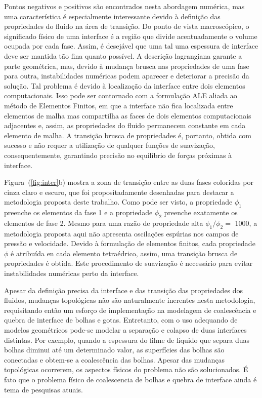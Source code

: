\documentclass[a4paper,portuges,12pt]{article}
\begin{document}
Pontos negativos e positivos são encontrados nesta abordagem numérica,
mas uma característica é especialmente interessante devido à definição
das propriedades do fluido na área de transição. Do ponto de vista
macroscópico, o significado físico de uma interface é a região que
divide acentuadamente o volume ocupada por cada fase. Assim, é desejável
que uma tal uma espessura de interface deve ser mantida tão fina quanto
possível. A descrição lagrangiana garante a parte geométrica, mas,
devido à mudança brusca nas propriedades de uma fase para outra,
instabilidades numéricas podem aparecer e deteriorar a precisão da
solução. Tal problema é devido à localização da interface entre dois
elementos computacionais. Isso pode ser contornado com a formulação ALE
aliada ao método de Elementos Finitos, em que a interface não fica
localizada entre elementos de malha mas compartilha as faces de dois
elementos computacionais adjacentes e, assim, as propriedades do fluido
permanecem constante em cada elemento de malha. A transição brusca de
propriedades é, portanto, obtida com sucesso e não requer a utilização
de qualquer funções de suavização, consequentemente, garantindo precisão
no equilíbrio de forças próximas à interface.

Figura~(\ref{fig:inter}b) mostra a zona de transição entre as duas fases
coloridas por cinza claro e escuro, que foi propositadamente desenhadas
para destacar a metodologia proposta deste trabalho. Como pode ser
visto, a propriedade $\phi_1$ preenche os elementos da fase 1 e a
propriedade $\phi_2$ preenche exatamente os elementos de fase 2. Mesmo
para uma razão de propriedade alta $\phi_1 / \phi_2 =$ 1000, a
metodologia proposta aqui não apresenta oscilações espúrias nos campos
de pressão e velocidade. Devido à formulação de elementos finitos, cada
propriedade $\phi$ é atribuída en cada elemento tetraédrico, assim, uma
transição brusca de propriedades é obtida. Este procedimento de
suavização é necessário para evitar instabilidades numéricas perto da
interface.

Apesar da definição precisa da interface e das transição das
propriedades dos fluidos, mudanças topológicas não são naturalmente
inerentes nesta metodologia, requisitando então um esforço de
implementação na modelagem de coalescência e quebra de interface de
bolhas e gotas. Entretanto, com o uso adequando de modelos geométricos
pode-se modelar a separação e colapso de duas interfaces distintas. Por
exemplo, quando a espessura do filme de líquido que separa duas bolhas
diminui até um determinado valor, as superfícies das bolhas são
conectadas e obtem-se a coalescência das bolhas. Apesar das mudanças
topológicas ocorrerem, os aspectos físicos do problema não são
solucionados. É fato que o problema físico de coalescencia de bolhas e
quebra de interface ainda é tema de pesquisas atuais.
\end{document}
